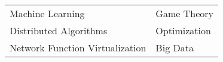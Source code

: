 \begin{tabular}{ll}
  Machine Learning                &Game Theory \\
  Distributed Algorithms          &Optimization \\
  Network Function Virtualization &Big Data \\
\end{tabular}
\medskip
